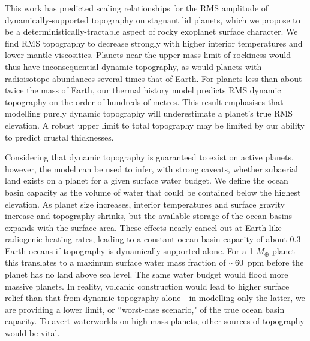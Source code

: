 \documentclass[trackchanges]{aastex63}
\begin{document}
This work has predicted scaling relationships for the RMS amplitude of dynamically-supported topography on stagnant lid planets, which we propose to be a deterministically-tractable aspect of rocky exoplanet surface character. We find RMS topography to decrease strongly with higher interior temperatures and lower mantle viscosities. Planets near the upper mass-limit of rockiness would thus have inconsequential dynamic topography, as would planets with radioisotope abundances several times that of Earth. For planets less than about twice the mass of Earth, our thermal history model predicts RMS dynamic topography on the order of hundreds of metres. This result emphasises that modelling purely dynamic topography will underestimate a planet's true RMS elevation. A robust upper limit to total topography may be limited by our ability to predict crustal thicknesses.

Considering that dynamic topography is guaranteed to exist on active planets, however, the model can be used to infer, with strong caveats, whether subaerial land exists on a planet for a given surface water budget. We define the ocean basin capacity as the volume of water that could be contained below the highest elevation. As planet size increases, interior temperatures and surface gravity increase and topography shrinks, but the available storage of the ocean basins expands with the surface area. These effects nearly cancel out at Earth-like radiogenic heating rates, leading to a constant ocean basin capacity of about 0.3 Earth oceans if topography is dynamically-supported alone. For a 1-$M_\oplus$ planet this translates to a maximum surface water mass fraction of $\sim$60~ppm before the planet has no land above sea level. The same water budget would flood more massive planets. In reality, volcanic construction would lead to higher surface relief than that from dynamic topography alone---in modelling only the latter, we are providing a lower limit, or ``worst-case scenario," of the true ocean basin capacity. To avert waterworlds on high mass planets, other sources of topography would be vital.




\end{document}

